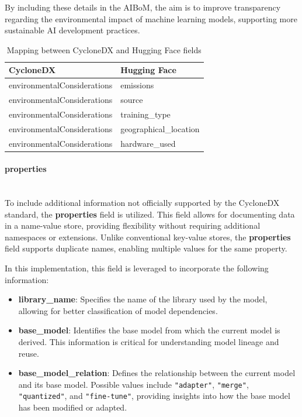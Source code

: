 \documentclass[12pt,a4paper, oneside, openright]{book}
\newcommand{\aibom}{{AIBoM}\xspace}
\begin{document}
By including these details in the \aibom, the aim is to improve transparency regarding the environmental impact of machine learning models, supporting more sustainable AI development practices.
\begin{table}[h!]
    \centering
    \begin{tabular}{|p{7cm}|p{6cm}|}
        \hline
        \textbf{CycloneDX} & \textbf{Hugging Face}\\ \hline
           environmentalConsiderations     
           & emissions
        \\ \hline
            environmentalConsiderations 
            & source
        \\ \hline    
            environmentalConsiderations 
            &  training\_type
        \\ \hline 
            environmentalConsiderations 
            &  geographical\_location
        \\ \hline
            environmentalConsiderations 
            &  hardware\_used
        \\ \hline        
    \end{tabular}
\caption{Mapping between CycloneDX and Hugging Face fields}
    \label{tab:cyclonedx_huggingface}
\end{table}


\paragraph{properties} \mbox{} \\
To include additional information not officially supported by the CycloneDX standard, the \textbf{properties} field is utilized. This field allows for documenting data in a name-value store, providing flexibility without requiring additional namespaces or extensions. Unlike conventional key-value stores, the \textbf{properties} field supports duplicate names, enabling multiple values for the same property.

In this implementation, this field is leveraged to incorporate the following information:
\begin{itemize} 
\item \textbf{library\_name}: Specifies the name of the library used by the model, allowing for better classification of model dependencies. 
\item \textbf{base\_model}: Identifies the base model from which the current model is derived. This information is critical for understanding model lineage and reuse. 
\item \textbf{base\_model\_relation}: Defines the relationship between the current model and its base model. Possible values include \texttt{"adapter"}, \texttt{"merge"}, \texttt{"quantized"}, and \texttt{"fine-tune"}, providing insights into how the base model has been modified or adapted. 
\end{itemize}
\end{document}
